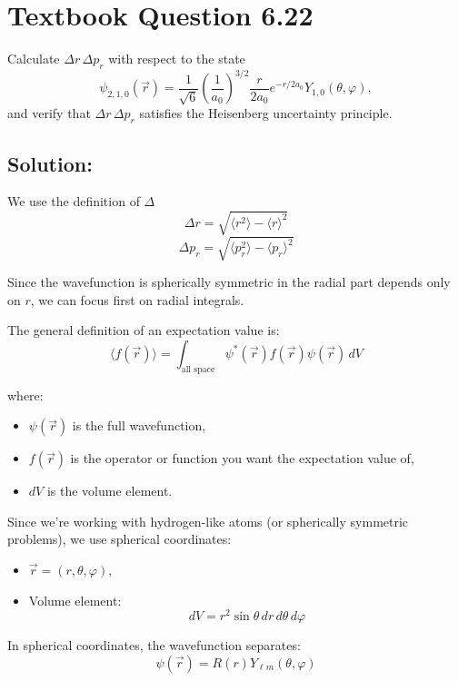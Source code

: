 \documentclass[12pt]{article}
\begin{document}
\section{Textbook Question 6.22}
    Calculate \( \Delta r \, \Delta p_r \) with respect to the state
    \[
        \psi_{2,1,0}(\vec{r}) = \frac{1}{\sqrt{6}} \left( \frac{1}{a_0} \right)^{3/2} \frac{r}{2a_0} e^{-r / 2a_0} Y_{1,0}(\theta, \varphi),
    \]
    and verify that \( \Delta r \, \Delta p_r \) satisfies the Heisenberg uncertainty principle.

    \subsection{Solution:}
        We use the definition of $\Delta$
        \[
            \Delta r = \sqrt{ \langle r^2 \rangle - \langle r \rangle^2 }
        \]
        \[
            \Delta p_r = \sqrt{ \langle p_r^2 \rangle - \langle p_r \rangle^2 }
        \]

        Since the wavefunction is spherically symmetric in the radial part depends only on \( r \), we can focus first on radial integrals.

        The general definition of an expectation value is:
        \[
            \langle f(\vec{r}) \rangle = \int_{\text{all space}} \psi^*(\vec{r}) f(\vec{r}) \psi(\vec{r}) \, dV
        \]

        where:
        \begin{itemize}
            \item \( \psi(\vec{r}) \) is the full wavefunction,
            \item \( f(\vec{r}) \) is the operator or function you want the expectation value of,
            \item \( dV \) is the volume element.
        \end{itemize}

        Since we're working with hydrogen-like atoms (or spherically symmetric problems), we use spherical coordinates:
        \begin{itemize}
            \item \( \vec{r} = (r, \theta, \varphi) \),
            \item Volume element:
            \[
                dV = r^2 \sin\theta \, dr \, d\theta \, d\varphi
            \]
        \end{itemize}

        In spherical coordinates, the wavefunction separates:
        \[
            \psi(\vec{r}) = R(r) Y_{\ell m}(\theta, \varphi)
        \]
\end{document}
